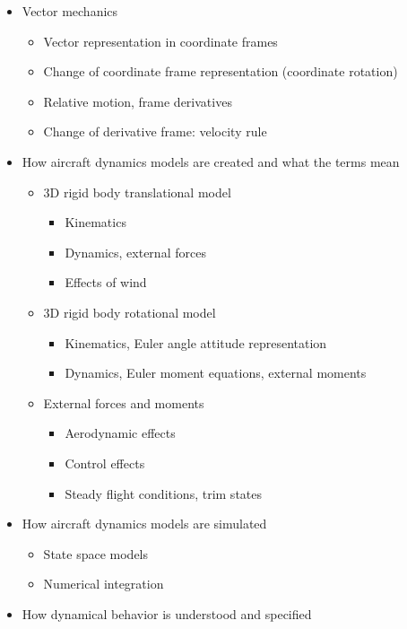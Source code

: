 \documentclass[9pt]{article}
\begin{document}
\begin{itemize}[nosep]
\item Vector mechanics
  \begin{itemize}[nosep]
  \item Vector representation in coordinate frames
  \item Change of coordinate frame representation (coordinate rotation)
  \item Relative motion, frame derivatives
  \item Change of derivative frame: velocity rule
  \end{itemize}
\item How aircraft dynamics models are created and what the terms mean
  \begin{itemize}[nosep]
  \item 3D rigid body translational model
    \begin{itemize}[nosep]
    \item Kinematics
    \item Dynamics, external forces
    \item Effects of wind
    \end{itemize}
  \item 3D rigid body rotational model
      \begin{itemize}[nosep]
    \item Kinematics, Euler angle attitude representation
    \item Dynamics, Euler moment equations, external moments
    \end{itemize}
  \item External forces and moments
      \begin{itemize}[nosep]
    \item Aerodynamic effects
    \item Control effects
    \item Steady flight conditions, trim states
    \end{itemize}
  \end{itemize}
\item How aircraft dynamics models are simulated
    \begin{itemize}[nosep]
    \item State space models
    \item Numerical integration
  \end{itemize}
\item How dynamical behavior is understood and specified
    \begin{itemize}[nosep]

\end{itemize}
\end{itemize}
\end{document}
